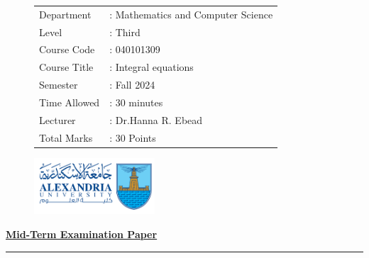 \documentclass[]{article}
\begin{document}
\thispagestyle{empty}
\begin{figure}
    \begin{minipage}{0.7\textwidth}
            \begin{tabular}{l l}
                Department &: Mathematics and Computer Science \\
                Level &: Third \\
                Course Code &: 040101309                      \\
                Course Title &:  Integral equations            \\
                Semester &: Fall 2024                        \\
                Time Allowed &: 30 minutes                    \\
                Lecturer &: Dr.Hanna R. Ebead                  \\
                Total Marks &: 30 Points                          \\
            \end{tabular}
    \end{minipage}%
    \begin{minipage}{0.3\textwidth}
        \includegraphics[width=4.5cm]{collagelogo.png}
    \end{minipage}
\end{figure}
\vspace*{-1cm}
\begin{center}
    \textbf{\underline{\LARGE Mid-Term Examination Paper}}
\end{center}
\vspace*{.2cm}

\hrule
\end{document}
